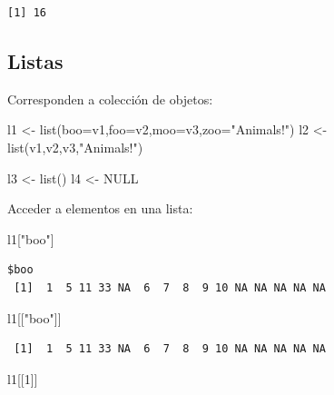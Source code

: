 \documentclass[
  letterpaper,
  DIV=11,
  numbers=noendperiod]{scrartcl}
\newenvironment{Shaded}{\begin{snugshade}}{\end{snugshade}}
\newcommand{\AttributeTok}[1]{\textcolor[rgb]{0.40,0.45,0.13}{#1}}
\newcommand{\ConstantTok}[1]{\textcolor[rgb]{0.56,0.35,0.01}{#1}}
\newcommand{\DecValTok}[1]{\textcolor[rgb]{0.68,0.00,0.00}{#1}}
\newcommand{\FunctionTok}[1]{\textcolor[rgb]{0.28,0.35,0.67}{#1}}
\newcommand{\NormalTok}[1]{\textcolor[rgb]{0.00,0.23,0.31}{#1}}
\newcommand{\OtherTok}[1]{\textcolor[rgb]{0.00,0.23,0.31}{#1}}
\newcommand{\StringTok}[1]{\textcolor[rgb]{0.13,0.47,0.30}{#1}}
\begin{document}
\begin{verbatim}
[1] 16
\end{verbatim}

\subsection{Listas}\label{listas}

Corresponden a colección de objetos:

\begin{Shaded}
\begin{Highlighting}[]
\NormalTok{l1 }\OtherTok{\textless{}{-}} \FunctionTok{list}\NormalTok{(}\AttributeTok{boo=}\NormalTok{v1,}\AttributeTok{foo=}\NormalTok{v2,}\AttributeTok{moo=}\NormalTok{v3,}\AttributeTok{zoo=}\StringTok{"Animals!"}\NormalTok{)  }
\NormalTok{l2 }\OtherTok{\textless{}{-}} \FunctionTok{list}\NormalTok{(v1,v2,v3,}\StringTok{"Animals!"}\NormalTok{)}

\NormalTok{l3 }\OtherTok{\textless{}{-}} \FunctionTok{list}\NormalTok{()}
\NormalTok{l4 }\OtherTok{\textless{}{-}} \ConstantTok{NULL}
\end{Highlighting}
\end{Shaded}

Acceder a elementos en una lista:

\begin{Shaded}
\begin{Highlighting}[]
\NormalTok{l1[}\StringTok{"boo"}\NormalTok{]      }
\end{Highlighting}
\end{Shaded}

\begin{verbatim}
$boo
 [1]  1  5 11 33 NA  6  7  8  9 10 NA NA NA NA NA
\end{verbatim}

\begin{Shaded}
\begin{Highlighting}[]
\NormalTok{l1[[}\StringTok{"boo"}\NormalTok{]]    }
\end{Highlighting}
\end{Shaded}

\begin{verbatim}
 [1]  1  5 11 33 NA  6  7  8  9 10 NA NA NA NA NA
\end{verbatim}

\begin{Shaded}
\begin{Highlighting}[]
\NormalTok{l1[[}\DecValTok{1}\NormalTok{]]        }
\end{Highlighting}
\end{Shaded}
\end{document}
